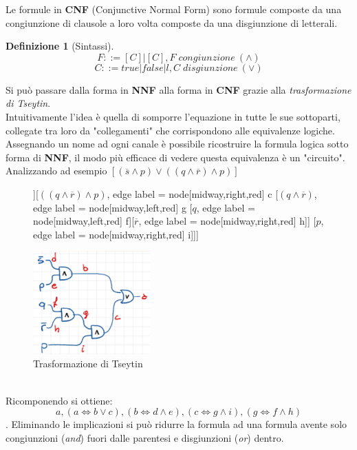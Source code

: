 \documentclass[a4paper]{article}
\newtheorem*{definition}{Definizione}
\begin{document}
Le formule in \textbf{CNF} (Conjunctive Normal Form) sono formule composte da una congiunzione di clausole a loro volta composte da una disgiunzione di letterali.
\begin{definition}[Sintassi]
	$$F::= [C]|[C],F \; congiunzione \: (\land)$$
	$$C::=true|false|l,C \; disgiunzione \: (\lor)$$
\end{definition}
Si può passare dalla forma in \textbf{NNF} alla forma in \textbf{CNF} grazie alla \textit{trasformazione di Tseytin}.\\
Intuitivamente l'idea è quella di somporre l'equazione in tutte le sue sottoparti, collegate tra loro da "collegamenti" che corrispondono alle equivalenze logiche.
Assegnando un nome ad ogni canale è possibile ricostruire la formula logica sotto forma di \textbf{NNF}, il modo più efficace di vedere questa equivalenza è un "circuito".
Analizzando ad esempio $[(\overline s \land p) \lor ((q \land \overline r) \land p)]$
\begin{figure}[!ht]
\centering
\begin{forest}
	[$(\overline s \land p) \lor ((q \land \overline r) \land p)$[$\overline s \land p$, , edge label = {node[midway,left,red] {b}} [$\overline s$, , edge label = {node[midway,left,red] {d}}][$p$,, edge label = {node[midway,right,red] {e}}]][$((q \land \overline r) \land p)$, edge label = {node[midway,right,red] {c}} [$(q \land \overline r)$, edge label = {node[midway,left,red] {g}} [$q$, edge label = {node[midway,left,red] {f}}][$\overline r$, edge label = {node[midway,right,red] {h}}]] [$p$, edge label = {node[midway,right,red] {i}}]]]
\end{forest}
\includegraphics[width=0.4\textwidth]{./img/E7_circuit}
\caption{Trasformazione di Tseytin} \label{FIG:E7_circuit}
\end{figure}\\
Ricomponendo si ottiene:
$$ a,(a \Leftrightarrow b \lor c), (b \Leftrightarrow d \land e), (c \Leftrightarrow g \land i), (g \Leftrightarrow f \land h)$$.
Eliminando le implicazioni si può ridurre la formula ad una formula avente solo congiunzioni (\textit{and}) fuori dalle parentesi e disgiunzioni (\textit{or}) dentro.
\end{document}
